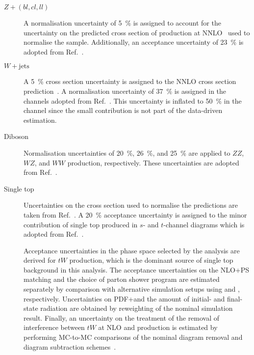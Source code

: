\begin{description}

\item[$Z + (bl, cl, ll)$] A normalisation uncertainty of
  \SI{5}{\percent} is assigned to account for the uncertainty on the
  predicted cross section of \Zjets production at
  NNLO~\cite{Anastasiou:2003ds} used to normalise the
  sample. Additionally, an acceptance uncertainty of \SI{23}{\percent}
  is adopted from Ref.~\cite{HIGG-2018-51}.

\item[$W + \text{jets}$] A \SI{5}{\percent} cross section uncertainty
  is assigned to the NNLO cross section
  prediction~\cite{Anastasiou:2003ds}. A normalisation uncertainty of
  \SI{37}{\percent} is assigned in the \lephad channels adopted from
  Ref.~\cite{HIGG-2018-51}. This uncertainty is inflated to
  \SI{50}{\percent} in the \hadhad channel since the small \Wjets
  contribution is not part of the data-driven \faketauhadvis
  estimation.

\item[Diboson] Normalisation uncertainties of \SI{20}{\percent},
  \SI{26}{\percent}, and \SI{25}{\percent} are applied to $ZZ$, $WZ$,
  and $WW$ production, respectively. These uncertainties are adopted
  from Ref.~\cite{HIGG-2018-51}.

\item[Single top] Uncertainties on the cross section used to normalise
  the predictions are taken from Ref.~\cite{stopxsec}. A
  \SI{20}{\percent} acceptance uncertainty is assigned to the minor
  contribution of single top produced in $s$- and $t$-channel diagrams
  which is adopted from Ref.~\cite{HIGG-2018-51}.

  Acceptance uncertainties in the phase space selected by the analysis
  are derived for $tW$ production, which is the dominant source of
  single top background in this analysis. The acceptance uncertainties
  on the NLO+PS matching and the choice of parton shower program are
  estimated separately by comparison with alternative simulation
  setups using \MGNLO[2.6.2] and \HERWIG[7],
  respectively. Uncertainties on PDF+\alphas and the amount of
  initial- and final-state radiation are obtained by reweighting of
  the nominal simulation result. Finally, an uncertainty on the
  treatment of the removal of interference between $tW$ at NLO
  and \ttbar production is estimated by performing MC-to-MC
  comparisons of the nominal diagram removal and diagram subtraction
  schemes~\cite{Frixione:2008yi}.


\end{description}
